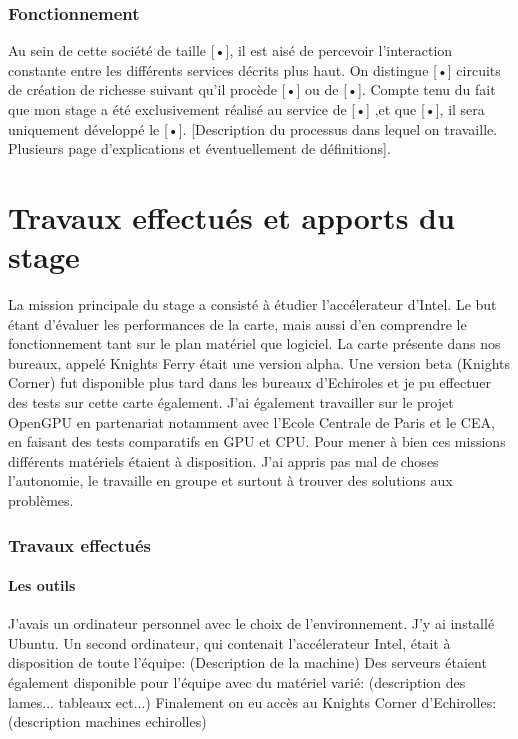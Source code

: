 \documentclass{article}
\begin{document}
	\section{Fonctionnement}
		Au sein de cette société de taille [•], il est aisé de percevoir l’interaction constante entre les différents 
		services décrits plus haut. On distingue [•] circuits de création de richesse suivant qu’il procède [•] ou de [•].
		Compte tenu du fait que mon stage a été exclusivement réalisé au service de [•] ,et que [•], il sera uniquement 
		développé le [•].
		[Description du processus dans lequel on travaille. Plusieurs page d’explications et éventuellement de définitions].

\newpage
{}
\part{Travaux effectués et apports du stage}
		La mission principale du stage a consisté à étudier l'accélerateur d'Intel. Le but étant d'évaluer les performances de la carte,
		mais aussi d'en comprendre le fonctionnement tant sur le plan matériel que logiciel. La carte présente dans nos bureaux,
		appelé Knights Ferry était une version alpha. Une version beta (Knights Corner) fut disponible plus tard dans les bureaux
		d'Echiroles et je pu effectuer des tests sur cette carte également.
		J'ai également travailler sur le projet OpenGPU en partenariat notamment avec l'Ecole Centrale de Paris et le CEA,
		en faisant des tests comparatifs en GPU et CPU.
		Pour mener à bien ces missions différents matériels étaient à disposition.
		J'ai appris pas mal de choses l'autonomie, le travaille en groupe et surtout à trouver des solutions aux problèmes.
	\section{Travaux effectués}
		\subsection{Les outils}
			J'avais un ordinateur personnel avec le choix de l'environnement. J'y ai installé Ubuntu.\newline
			Un second ordinateur, qui contenait l'accélerateur Intel, était à disposition de toute l'équipe:\newline
				(Description de la machine)\newline
			Des serveurs étaient également disponible pour l'équipe avec du matériel varié:\newline
				(description des lames... tableaux ect...)\newline
			Finalement on eu accès au Knights Corner d'Echirolles:\newline
				(description machines echirolles)\newline
\end{document}
